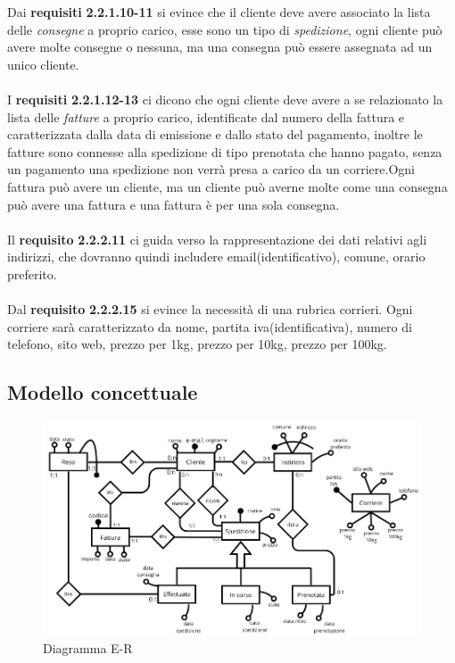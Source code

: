 \documentclass[a4paper,12pt]{article}
\begin{document}
Dai \textbf{requisiti} \textbf{2.2.1.10-11} si evince che il cliente deve avere associato la lista delle \textit{consegne} a proprio carico,  esse sono un tipo di \textit{spedizione}, ogni cliente può avere molte consegne o nessuna, ma una consegna può essere assegnata ad un unico cliente.
\\\\
I \textbf{requisiti} \textbf{2.2.1.12-13} ci dicono che ogni cliente deve avere a se relazionato la lista delle \textit{fatture} a proprio carico, identificate dal numero della fattura e caratterizzata dalla data di emissione e dallo stato del pagamento, inoltre le fatture sono connesse alla spedizione di tipo prenotata che hanno pagato, senza un pagamento una spedizione non verrà presa a carico da un corriere.Ogni fattura può avere un cliente, ma un cliente può averne molte come una consegna può avere una fattura e una fattura è per una sola consegna.
\\\\
Il \textbf{requisito} \textbf{2.2.2.11} ci guida verso la rappresentazione dei dati relativi agli indirizzi, che dovranno quindi includere 
email(identificativo), comune, orario preferito. \\ \\
Dal \textbf{requisito} \textbf{2.2.2.15} si evince la necessità di una rubrica corrieri. Ogni corriere sarà caratterizzato da nome, 
partita iva(identificativa), numero di telefono, sito web, prezzo per 1kg, prezzo per 10kg, prezzo per 100kg.

\subsection{Modello concettuale}
\begin{figure}[H]
  \centering
  \includegraphics[width=\textwidth]{assets/ER_diagram.jpg}
  \caption{Diagramma E-R}
\end{figure}
\end{document}
